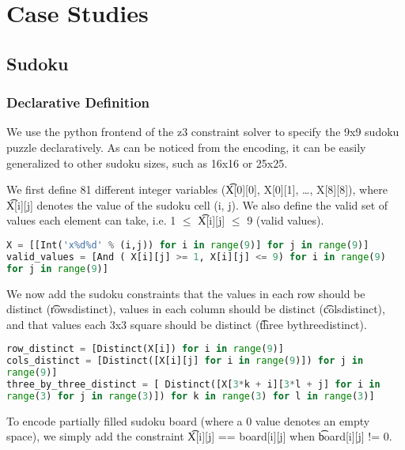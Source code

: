 \section{Case Studies}

\subsection{Sudoku}

\subsubsection{Declarative Definition}
We use the python frontend of the z3 constraint solver to specify the 9x9
sudoku puzzle declaratively. As can be noticed from the encoding, it
can be easily generalized to other sudoku sizes, such as 16x16 or
25x25.

We first define 81 different integer variables (\t{X[0][0], X[0][1], \ldots,
X[8][8]}), where \t{X[i][j]} denotes the value of the sudoku cell (i, j). We
also define the valid set of values each element can take, i.e. 1 $\leq$
\t{X[i][j]} $\leq$ 9 (valid values).

\singlespace
\begin{lstlisting}[language=python, frame = single]
X = [[Int('x%d%d' % (i,j)) for i in range(9)] for j in range(9)]
valid_values = [And ( X[i][j] >= 1, X[i][j] <= 9) for i in range(9)
for j in range(9)]
\end{lstlisting}
\doublespace

We now add the sudoku constraints that the values in each row should
be distinct (\t{rows\textunderscore distinct}), values in each column
should be distinct (\t{cols\textunderscore distinct}), and that values
each 3x3 square should be distinct (\t{three\textunderscore
  by\textunderscore three\textunderscore distinct}).

\singlespace
\begin{lstlisting}[language=python, frame = single]
row_distinct = [Distinct(X[i]) for i in range(9)]
cols_distinct = [Distinct([X[i][j] for i in range(9)]) for j in
range(9)] 
three_by_three_distinct = [ Distinct([X[3*k + i][3*l + j] for i in
range(3) for j in range(3)]) for k in range(3) for l in range(3)]

\end{lstlisting}
\doublespace

To encode partially filled sudoku board (where a 0 value denotes an
empty space), we simply add the constraint \t{X[i][j] == board[i][j]} when
\t{board[i][j]} != 0. 

